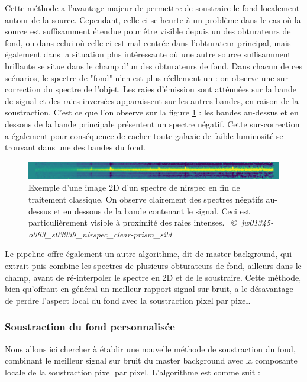 \documentclass[11pt, a4paper]{article}
\newcommand{\customcite}[2]{\mbox{
  {\small \copyright} \textit{#1} \cite{#2}}
}
\begin{document}
  Cette méthode a l'avantage majeur de permettre de soustraire le fond localement autour de la source. Cependant, celle ci se heurte à un problème dans le cas où la source est suffisamment étendue pour être visible depuis un des obturateurs de fond, ou dans celui où celle ci est mal centrée dans l'obturateur principal, mais également dans la situation plus intéressante où une autre source suffisamment brillante se situe dans le champ d'un des obturateurs de fond. Dans chacun de ces scénarios, le spectre de "fond" n'en est plus réellement un : on observe une sur-correction du spectre de l'objet. Les raies d'émission sont atténuées sur la bande de signal et des raies inversées apparaissent sur les autres bandes, en raison de la soustraction. C'est ce que l'on observe sur la figure \ref{fig:negative_trace} : les bandes au-dessus et en dessous de la bande principale présentent un spectre négatif. Cette sur-correction a également pour conséquence de cacher toute galaxie de faible luminosité se trouvant dans une des bandes du fond.\\
  
  \begin{figure}[H]
    \centering
    \includegraphics[scale=1.1]{assets/negative_trace_nirspec.png}
    \caption{Exemple d'une image 2D d'un spectre de \gls{nirspec} en fin de traitement classique. On observe clairement des spectres négatifs au-dessus et en dessous de la bande contenant le signal. Ceci est particulièrement visible à proximité des raies intenses. \customcite{jw01345-o063\_s03939\_nirspec\_clear-prism\_s2d}{portal_mast}}
    \label{fig:negative_trace}
  \end{figure}

  Le pipeline offre également un autre algorithme, dit de master background, qui extrait puis combine les spectres de plusieurs obturateurs de fond, ailleurs dans le champ, avant de ré-interpoler le spectre en 2D et de le soustraire. Cette méthode, bien qu'offrant en général un meilleur rapport signal sur bruit, a le désavantage de perdre l'aspect local du fond avec la soustraction pixel par pixel.

  \subsubsection{Soustraction du fond personnalisée}

  Nous allons ici chercher à établir une nouvelle méthode de soustraction du fond, combinant le meilleur signal sur bruit du master background avec la composante locale de la soustraction pixel par pixel. L'algorithme est comme suit :\\
\end{document}
